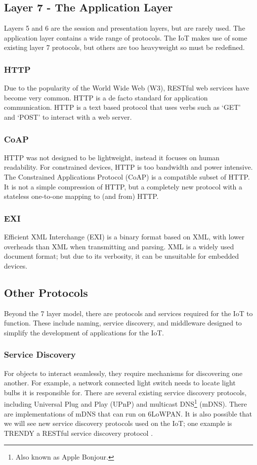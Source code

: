 \documentclass[10pt,journal,compsoc]{IEEEtran}
\begin{document}
\subsection{Layer 7 - The Application Layer}
Layers 5 and 6 are the session and presentation layers, but are rarely used.
The application layer contains a wide range of protocols. The IoT  makes use of
some existing layer 7 protocols, but others are too heavyweight so must be
redefined. 

\subsubsection{HTTP} Due to the popularity of the World Wide Web (W3), RESTful
web services have become very common. HTTP is a de facto standard for
application communication. HTTP is a text based protocol that uses verbs such
as `GET' and `POST' to interact with a web server.  

\subsubsection{CoAP}
HTTP was not designed to be lightweight, instead it focuses on human
readability. For constrained devices, HTTP is too bandwidth and power
intensive. The Constrained Applications Protocol (CoAP) is a compatible subset
of HTTP. It is not a simple compression of HTTP, but a completely new protocol
with a stateless one-to-one mapping to (and from) HTTP. 

\subsubsection{EXI}
Efficient XML Interchange (EXI) is a binary format based on XML, with lower
overheads than XML when transmitting and parsing. XML is a widely used document
format; but due to its verbosity, it can be unsuitable for embedded devices. 

\subsection{Other Protocols} 
Beyond the 7 layer model, there are protocols and services required for the IoT
to function. These include naming, service discovery, and middleware designed
to simplify the development of applications for the IoT.

\subsubsection{Service Discovery}
For objects to interact seamlessly, they require mechanisms for discovering one
another. For example, a network connected light switch needs to locate light
bulbs it is responsible for. There are several existing service discovery
protocols, including Universal Plug and Play (UPnP) and multicast
DNS\footnote{Also known as Apple Bonjour.} (mDNS). There are implementations of
mDNS that can run on 6LoWPAN. It is also possible that we will see new service
discovery protocols used on the IoT; one example is TRENDY a RESTful service
discovery protocol \cite{Butt2013}. 
\end{document}
